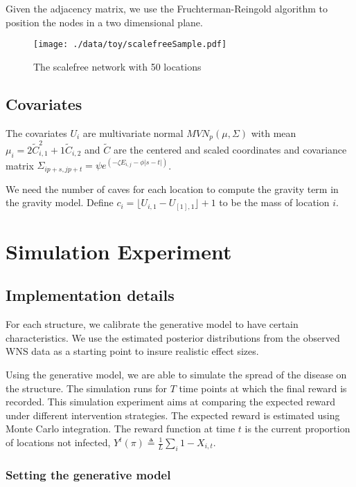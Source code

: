 \documentclass[11pt]{article}
\begin{document}
Given the adjacency matrix, we use the Fruchterman-Reingold algorithm
to position the nodes in a two dimensional plane.


\begin{figure}[htb]
\centering
\texttt{[image: ./data/toy/scalefreeSample.pdf]}
\caption{\label{fig:scalefree50}The scalefree network with 50 locations}
\end{figure}




\subsection{Covariates}
\label{sec-3-2}

The covariates $U_i$ are multivariate normal $MVN_p(\mu,\Sigma)$
with mean $\mu_i = 2\widetilde{C}_{i,1}^2 + 1\widetilde{C}_{i,2}$
and $\widetilde{C}$ are the centered and scaled coordinates and
covariance matrix $\Sigma_{ip + s, jp + t} = \psi e^{(-\zeta
   E_{i,j} - \phi |s-t|)}$.

We need the number of caves for each location to compute the
gravity term in the gravity model.  Define $c_i = \lfloor U_{i,1} -
   U_{[1],1} \rfloor + 1$ to be the mass of location $i$.


\section{Simulation Experiment}
\label{sec-4}

\subsection{Implementation details}
\label{sec-4-1}

For each structure, we calibrate the generative model to have
certain characteristics.  We use the estimated posterior
distributions from the observed WNS data as a starting point to
insure realistic effect sizes.

Using the generative model, we are able to simulate the spread of
the disease on the structure.  The simulation runs for $T$ time
points at which the final reward is recorded.  This simulation
experiment aims at comparing the expected reward under different
intervention strategies.  The expected reward is estimated using
Monte Carlo integration.  The reward function at time $t$ is the
current proportion of locations not infected, $Y^t(\pi) \triangleq
   \frac{1}{L}\sum_i 1 - X_{i,t}$.

\subsubsection{Setting the generative model}
\label{sec-4-1-1}
\end{document}
